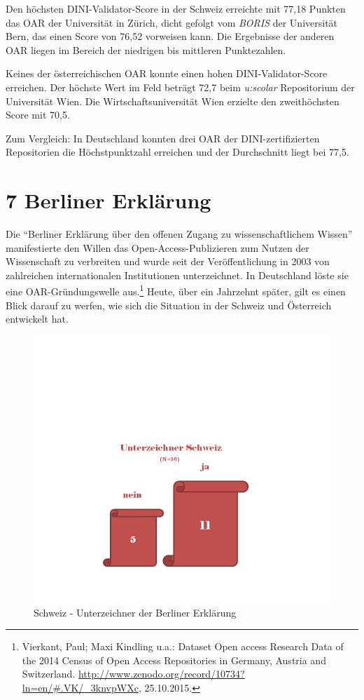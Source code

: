 \documentclass[a4paper,
fontsize=11pt,
oneside,
numbers=noperiodatend,
parskip=half-,
bibliography=totoc,
final
]{scrartcl}
\begin{document}
Den höchsten DINI-Validator-Score in der Schweiz erreichte mit 77,18
Punkten das OAR der Universität in Zürich, dicht gefolgt vom
\emph{BORIS} der Universität Bern, das einen Score von 76,52 vorweisen
kann. Die Ergebnisse der anderen OAR liegen im Bereich der niedrigen bis
mittleren Punktezahlen.

Keines der österreichischen OAR konnte einen hohen DINI-Validator-Score
erreichen. Der höchste Wert im Feld beträgt 72,7 beim \emph{u:scolar}
Repositorium der Universität Wien. Die Wirtschaftsuniversität Wien
erzielte den zweithöchsten Score mit 70,5.

Zum Vergleich: In Deutschland konnten drei OAR der DINI-zertifizierten
Repositorien die Höchstpunktzahl erreichen und der Durchschnitt liegt
bei 77,5.

\section*{7 Berliner Erklärung}\label{berliner-erkluxe4rung}

Die \enquote{Berliner Erklärung über den offenen Zugang zu
wissenschaftlichem Wissen} manifestierte den Willen das
Open-Access-Publizieren zum Nutzen der Wissenschaft zu verbreiten und
wurde seit der Veröffentlichung in 2003 von zahlreichen internationalen
Institutionen unterzeichnet. In Deutschland löste sie eine
OAR-Gründungswelle aus.\footnote{Vierkant, Paul; Maxi Kindling u.a.:
  Dataset Open access Research Data of the 2014 Census of Open Access
  Repositories in Germany, Austria and Switzerland.
  \url{http://www.zenodo.org/record/10734?ln=en/\#.VK/_3knvpWXc},
  25.10.2015.} Heute, über ein Jahrzehnt später, gilt es einen Blick
darauf zu werfen, wie sich die Situation in der Schweiz und Österreich
entwickelt hat.

\begin{figure}[htbp]
\centering
\includegraphics{img/unterzeichner-schweiz.jpg}
\caption{Schweiz - Unterzeichner der Berliner Erklärung}
\end{figure}
\end{document}
